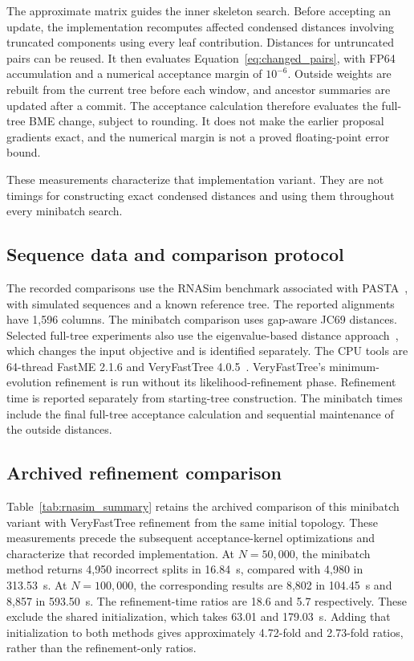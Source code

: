 The approximate matrix guides the inner skeleton search.
Before accepting an update, the implementation recomputes affected condensed distances involving truncated components using every leaf contribution.
Distances for untruncated pairs can be reused.
It then evaluates Equation~\eqref{eq:changed_pairs}, with FP64 accumulation and a numerical acceptance margin of $10^{-6}$.
Outside weights are rebuilt from the current tree before each window, and ancestor summaries are updated after a commit.
The acceptance calculation therefore evaluates the full-tree BME change, subject to rounding.
It does not make the earlier proposal gradients exact, and the numerical margin is not a proved floating-point error bound.

These measurements characterize that implementation variant.
They are not timings for constructing exact condensed distances and using them throughout every minibatch search.

\subsection{Sequence data and comparison protocol}

The recorded comparisons use the RNASim benchmark associated with PASTA~\cite{mirarab2015pasta}, with simulated sequences and a known reference tree.
The reported alignments have 1,596 columns.
The minibatch comparison uses gap-aware JC69 distances.
Selected full-tree experiments also use the eigenvalue-based distance approach~\cite{penn2025eigen}, which changes the input objective and is identified separately.
The CPU tools are 64-thread FastME 2.1.6 and VeryFastTree 4.0.5~\cite{lefort2015fastme,pineiro2020veryfasttree}.
VeryFastTree's minimum-evolution refinement is run without its likelihood-refinement phase.
Refinement time is reported separately from starting-tree construction.
The minibatch times include the final full-tree acceptance calculation and sequential maintenance of the outside distances.

\subsection{Archived refinement comparison}

Table~\ref{tab:rnasim_summary} retains the archived comparison of this minibatch variant with VeryFastTree refinement from the same initial topology.
These measurements precede the subsequent acceptance-kernel optimizations and characterize that recorded implementation.
At $N=50{,}000$, the minibatch method returns 4,950 incorrect splits in 16.84~s, compared with 4,980 in 313.53~s.
At $N=100{,}000$, the corresponding results are 8,802 in 104.45~s and 8,857 in 593.50~s.
The refinement-time ratios are 18.6 and 5.7 respectively.
These exclude the shared initialization, which takes 63.01 and 179.03~s.
Adding that initialization to both methods gives approximately 4.72-fold and 2.73-fold ratios, rather than the refinement-only ratios.

